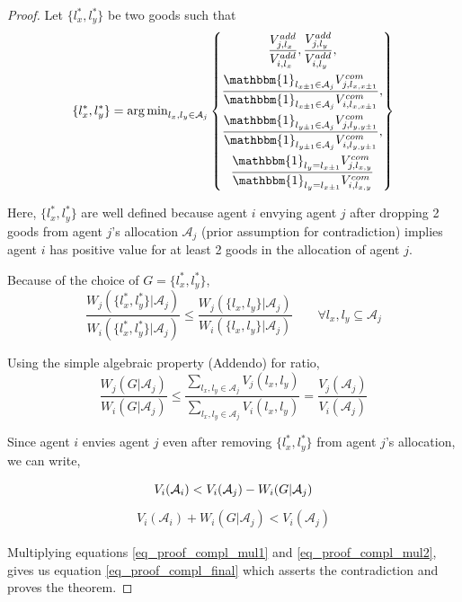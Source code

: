 \begin{proof}
Let $\{l_x^*, l_y^*\}$ be two goods such that
\begin{equation}
\label{eq_constrain_pair_compl}
    \{l_x^*, l_y^*\} = \operatorname{arg\,min}_{l_x,l_y \in \mathcal{A}_j} \left\{
    \begin{gathered}
        \frac{V_{j,l_x}^{add}}{V_{i,l_x}^{add}},
        \frac{V_{j,l_y}^{add}}{V_{i,l_y}^{add}}, \\
        \frac{\mathbbm{1}_{l_{x \pm 1} \in \mathcal{A}_j}V_{j,l_{x,x\pm 1}}^{com}}{\mathbbm{1}_{l_{x \pm 1} \in \mathcal{A}_j}V_{i,l_{x,x\pm 1}}^{com}}, \\
        \frac{\mathbbm{1}_{l_{y \pm 1} \in \mathcal{A}_j}V_{j,l_{y,y\pm 1}}^{com}}{\mathbbm{1}_{l_{y \pm 1} \in \mathcal{A}_j}V_{i,l_{y,y\pm 1}}^{com}}, \\
        \frac{\mathbbm{1}_{l_y = l_{x \pm 1}}V_{j,l_{x,y}}^{com}}{\mathbbm{1}_{l_y = l_{x \pm 1}}V_{i,l_{x,y}}^{com}}
    \end{gathered}
    \right\}
\end{equation}

Here, $\{l_x^*, l_y^*\}$ are well defined because agent $i$ envying agent $j$ after dropping 2 goods from agent $j$'s allocation $\mathcal{A}_j$ (prior assumption for contradiction) implies agent $i$ has positive value for at least 2 goods in the allocation of agent $j$.

Because of the choice of $G = \{l_x^*, l_y^*\}$, 
\[
    \frac{W_j(\{l_x^*,l_y^*\}|\mathcal{A}_j)}{W_i(\{l_x^*,l_y^*\}|\mathcal{A}_j)} \leq \frac{W_j(\{l_x,l_y\}|\mathcal{A}_j)}{W_i(\{l_x,l_y\}|\mathcal{A}_j)} \qquad \forall {l_x, l_y} \subseteq \mathcal{A}_j
\]

Using the simple algebraic property (Addendo) for ratio,
\begin{equation}
\label{eq_proof_compl_mul1}
    \frac{W_j(G|\mathcal{A}_j)}{W_i(G|\mathcal{A}_j)} \leq \frac{\sum_{l_x,l_y \in \mathcal{A}_j}V_j(l_x,l_y)}{\sum_{l_x,l_y \in \mathcal{A}_j}V_i(l_x,l_y)} = \frac{V_j(\mathcal{A}_j)}{V_i(\mathcal{A}_j)}
\end{equation}

Since agent $i$ envies agent $j$ even after removing $\{l_x^*, l_y^*\}$ from agent $j$'s allocation, we can write,

\[
    V_i(\mathcal{A}_i) < V_i(\mathcal{A}_j) - W_i(G|\mathcal{A}_j) \\
\]
\begin{equation}
\label{eq_proof_compl_mul2}
\begin{gathered}
    V_i(\mathcal{A}_i) + W_i(G|\mathcal{A}_j) < V_i(\mathcal{A}_j)
\end{gathered}
\end{equation}

Multiplying equations \ref{eq_proof_compl_mul1} and \ref{eq_proof_compl_mul2}, gives us equation \ref{eq_proof_compl_final} which asserts the contradiction and proves the theorem.

\end{proof}

